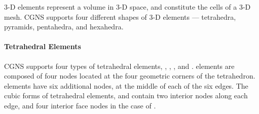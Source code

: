 {{{3-D elements represent a volume in 3-D space, and constitute the cells
of a 3-D mesh.
CGNS supports four different shapes of 3-D elements --- tetrahedra,
pyramids, pentahedra, and hexahedra.

\paragraph{Tetrahedral Elements}
CGNS supports four types of tetrahedral elements, ,
, , and .
 elements are composed of four nodes located at the
four geometric corners of the tetrahedron.
 elements have six additional nodes, at the middle
of each of the six edges.
The cubic forms of tetrahedral elements,  and 
contain two interior nodes along each edge, and four interior face nodes
in the case of .


}}}
